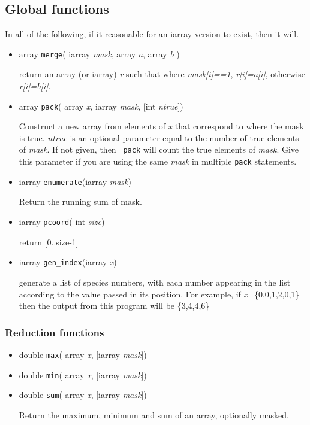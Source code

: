 \subsection{Global functions}

In all of the following, if it reasonable for an iarray version to
exist, then it will.

\begin{itemize}
\item array {\tt merge}( iarray {\em mask}, array {\em a}, array {\em b} )

return an array (or iarray) {\em r} such that where {\em mask[i]==1},
{\em r[i]=a[i]}, otherwise {\em r[i]=b[i]}.

\item array {\tt pack}( array {\em x}, iarray {\em mask}, [int {\em
ntrue}])

Construct a new array from elements of  {\em x} that correspond to
where the mask is true. {\em ntrue} is an optional parameter equal to
the number of true elements of {\em mask}. If not given, then {\tt
pack} will count the true elements of {\em mask}. Give this parameter
if you are using the same {\em mask} in multiple {\tt pack} statements.

\item iarray {\tt enumerate}(iarray {\em mask})

Return the running sum of mask.

\item iarray {\tt pcoord}( int {\em size})

return [0..size-1]

\item iarray {\tt gen\_index}(iarray {\em x}) 

generate a list of species numbers, with each number appearing in the
list according to the value passed in its position. For example, if
{\em x}=\{0,0,1,2,0,1\} then the output from this program will be
\{3,4,4,6\}


\end{itemize}

\subsubsection{Reduction functions}

\begin{itemize}
\item double {\tt max}( array {\em x}, [iarray {\em mask}]) 
\item double {\tt min}( array {\em x}, [iarray {\em mask}]) 
\item double {\tt sum}( array {\em x}, [iarray {\em mask}]) 

Return the maximum, minimum and sum of an array, optionally masked.

\end{itemize}

